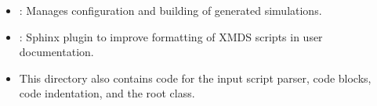 \documentclass[letterpaper,10pt,english]{sphinxmanual}
\begin{document}
\begin{itemize}
\begin{description}
\begin{itemize}
\item {} 
\sphinxAtStartPar
{}: Manages configuration and building of generated simulations.

\item {} 
\sphinxAtStartPar
{}: Sphinx plug\sphinxhyphen{}in to improve formatting of XMDS scripts in user documentation.

\item {} 
\sphinxAtStartPar
This directory also contains code for the input script parser, code blocks, code indentation, and the root  class.

\end{itemize}

\end{description}

\end{itemize}
\end{document}
